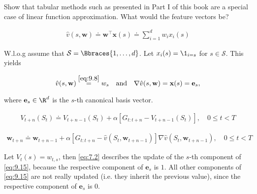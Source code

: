 
\begin{exercise}[Exercise 9.1]

Show that tabular methods such as presented in Part I of this book are a special case of linear function approximation.
What would the feature vectors be?

\end{exercise}


\begin{solution}

\begin{align} \label{eq:9.8} \tag{9.8}
    \hat v(s, \mathbf w)
    \doteq
    \mathbf w^\top \mathbf x(s)
    \doteq
    \sum_{i=1}^d w_i x_i(s)
\end{align}

W.l.o.g assume that $\mathcal S = \Bbraces{1, \dots, d}$.
Let $x_i(s) = \1_{i=s}$ for $s \in \mathcal S$.
This yields

\begin{align*}
    \hat v(s, \mathbf w) \stackrel{\eqref{eq:9.8}}{=} w_s
    \quad
    \text{and}
    \quad
    \nabla \hat v(s, \mathbf w) = \mathbf x(s) = \mathbf e_s,
\end{align*}

where $\mathbf e_s \in \R^d$ is the $s$-th canonical basis vector.

\begin{align} \label{eq:7.2} \tag{7.2}
    V_{t+n}(S_t)
    \doteq
    V_{t+n-1}(S_t)
    +
    \alpha [G_{t:t+n} - V_{t+n-1}(S_t)],
    \quad
    0 \leq t < T
\end{align}

\begin{align} \label{eq:9.15} \tag{9.15}
    \mathbf w_{t+n}
    \doteq
    \mathbf w_{t+n-1}
    +
    \alpha [G_{t:t+n} - \hat v(S_t, \mathbf w_{t+n-1})] \nabla \hat v(S_t, \mathbf w_{t+n-1}),
    \quad
    0 \leq t < T
\end{align}

Let $V_t(s) = w_{t, s}$, then \eqref{eq:7.2} describes the update of the $s$-th component of \eqref{eq:9.15}, because the respective component of $\mathbf e_s$ is $1$.
All other components of \eqref{eq:9.15} are not really updated (i.e. they inherit the previous value), since the respective component of $\mathbf e_s$ is $0$.

\end{solution}

